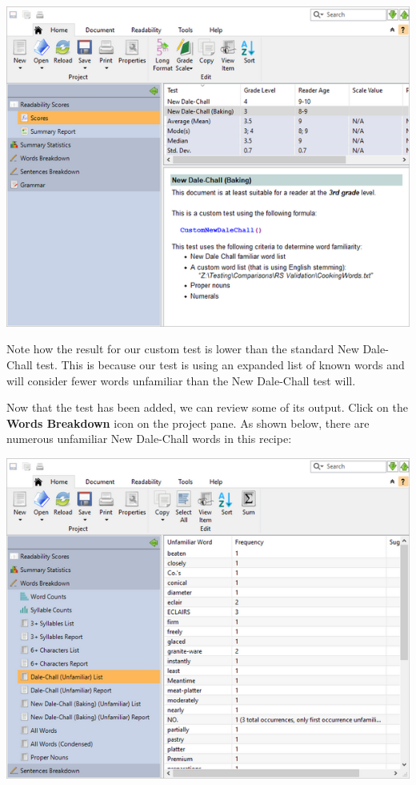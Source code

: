 \documentclass[
]{book}
\theoremstyle{definition}
\theoremstyle{definition}
\theoremstyle{definition}
\theoremstyle{definition}
\theoremstyle{remark}
\begin{document}
\includegraphics{Images/CustomTestExample2Score.png}

Note how the result for our custom test is lower than the standard New Dale-Chall test. This is because our test is using an expanded list of known words and will consider fewer words unfamiliar than the New Dale-Chall test will.

Now that the test has been added, we can review some of its output. Click on the \textbf{Words Breakdown} icon on the project pane. As shown below, there are numerous unfamiliar New Dale-Chall words in this recipe:

\includegraphics{Images/CustomTestExample2DCWordList.png}
\end{document}
